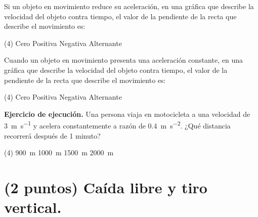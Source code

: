 \documentclass[12pt, letter]{exam}
\begin{document}
\begin{questions}
    \question Si un objeto en movimiento reduce su aceleración, en una gráfica que describe la velocidad del objeto contra tiempo, el valor de la pendiente de la recta que describe el movimiento es:
    \begin{tasks}(4)
        \task Cero
        \task Positiva
        \task Negativa
        \task Alternante
    \end{tasks}
    \question Cuando un objeto en movimiento presenta una aceleración constante, en una gráfica que describe la velocidad del objeto contra tiempo, el valor de la pendiente de la recta que describe el movimiento es:
    \begin{tasks}(4)
        \task Cero
        \task Positiva
        \task Negativa
        \task Alternante
    \end{tasks}
    \question \label{Ejercicio_04} \textbf{Ejercicio de ejecución. } Una persona viaja en motocicleta a una velocidad de \SI{3}{\meter\per\second} y acelera constantemente a razón de \SI{0.4}{\meter\per\square\second}. ¿Qué distancia recorrerá después de 1 minuto?
    \begin{tasks}(4)
        \task \SI{900}{\meter}
        \task \SI{1000}{\meter}
        \task \SI{1500}{\meter}
        \task \SI{2000}{\meter}
    \end{tasks}
    
    \section{(2 puntos) Caída libre y tiro vertical.}
    

\end{questions}
\end{document}
